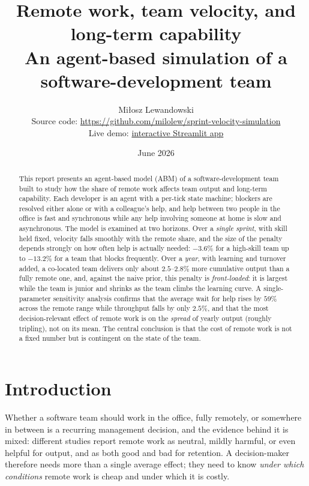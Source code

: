 \documentclass[11pt,a4paper]{article}
\title{Remote work, team velocity, and long-term capability\\
       \large An agent-based simulation of a software-development team}
\author{Miłosz Lewandowski\\[4pt]
        \small Source code: \url{https://github.com/milolew/sprint-velocity-simulation}\\[2pt]
        \small Live demo: \href{https://sprint-velocity-simulation-6oaiwsd3eqgf6r3qwfapkz.streamlit.app/}{interactive Streamlit app}}
\date{June 2026}
\begin{document}
\maketitle
\vspace{-1.5em plus 0.3em minus 0.3em}

\begin{abstract}
\noindent
This report presents an agent-based model (ABM) of a software-development team built to study how
the share of remote work affects team output and long-term capability. Each developer is an agent
with a per-tick state machine; blockers are resolved either alone or with a colleague's help, and
help between two people in the office is fast and synchronous while any help involving someone at
home is slow and asynchronous. The model is examined at two horizons. Over a \emph{single sprint},
with skill held fixed, velocity falls smoothly with the remote share, and the size of the penalty
depends strongly on how often help is actually needed: $-3.6\%$ for a high-skill team up to
$-13.2\%$ for a team that blocks frequently. Over a \emph{year}, with learning and turnover added,
a co-located team delivers only about $2.5$--$2.8\%$ more cumulative output than a fully remote one,
and, against the naive prior, this penalty is \emph{front-loaded}: it is largest while the team is
junior and shrinks as the team climbs the learning curve. A single-parameter sensitivity analysis
confirms that the average wait for help rises by $59\%$ across the remote range while throughput
falls by only $2.5\%$, and that the most decision-relevant effect of remote work is on the
\emph{spread} of yearly output (roughly tripling), not on its mean. The central conclusion is that
the cost of remote work is not a fixed number but is contingent on the state of the team.
\end{abstract}

\vspace{0.0em}
\begingroup
\setlength{\parskip}{0pt}
\renewcommand{\baselinestretch}{0.80}\selectfont
{\footnotesize\tableofcontents}
\endgroup
\vspace{0.4em}

\section{Introduction}

Whether a software team should work in the office, fully remotely, or somewhere in between is a
recurring management decision, and the evidence behind it is mixed: different studies report
remote work as neutral, mildly harmful, or even helpful for output, and as both good and bad for
retention. A decision-maker therefore needs more than a single average effect; they need to know
\emph{under which conditions} remote work is cheap and under which it is costly.
\end{document}
